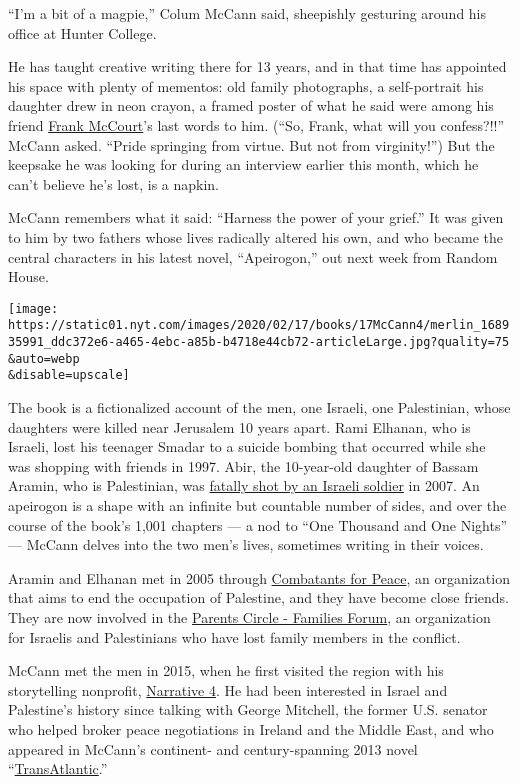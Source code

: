 ``I'm a bit of a magpie,'' Colum McCann said, sheepishly gesturing
around his office at Hunter College.

He has taught creative writing there for 13 years, and in that time has
appointed his space with plenty of mementos: old family photographs, a
self-portrait his daughter drew in neon crayon, a framed poster of what
he said were among his friend
\href{https://www.nytimes.com/2009/07/20/books/20mccourt.html}{Frank
McCourt}'s last words to him. (``So, Frank, what will you confess?!!''
McCann asked. ``Pride springing from virtue. But not from virginity!'')
But the keepsake he was looking for during an interview earlier this
month, which he can't believe he's lost, is a napkin.

McCann remembers what it said: ``Harness the power of your grief.'' It
was given to him by two fathers whose lives radically altered his own,
and who became the central characters in his latest novel,
``Apeirogon,'' out next week from Random House.

\texttt{[image: https://static01.nyt.com/images/2020/02/17/books/17McCann4/merlin\_168935991\_ddc372e6-a465-4ebc-a85b-b4718e44cb72-articleLarge.jpg?quality=75\\\&auto=webp\\\&disable=upscale]}

The book is a fictionalized account of the men, one Israeli, one
Palestinian, whose daughters were killed near Jerusalem 10 years apart.
Rami Elhanan, who is Israeli, lost his teenager Smadar to a suicide
bombing that occurred while she was shopping with friends in 1997. Abir,
the 10-year-old daughter of Bassam Aramin, who is Palestinian, was
\href{https://www.nytimes.com/2020/01/09/movies/afterward-review.html}{fatally
shot by an Israeli soldier} in 2007. An apeirogon is a shape with an
infinite but countable number of sides, and over the course of the
book's 1,001 chapters --- a nod to ``One Thousand and One Nights'' ---
McCann delves into the two men's lives, sometimes writing in their
voices.

Aramin and Elhanan met in 2005 through
\href{https://cfpeace.org/}{Combatants for Peace}, an organization that
aims to end the occupation of Palestine, and they have become close
friends. They are now involved in the
\href{https://www.theparentscircle.org/en/pcff-home-page-en/}{Parents
Circle - Families Forum}, an organization for Israelis and Palestinians
who have lost family members in the conflict.

McCann met the men in 2015, when he first visited the region with his
storytelling nonprofit, \href{https://narrative4.com/}{Narrative 4}. He
had been interested in Israel and Palestine's history since talking with
George Mitchell, the former U.S. senator who helped broker peace
negotiations in Ireland and the Middle East, and who appeared in
McCann's continent- and century-spanning 2013 novel
``\href{https://www.nytimes.com/2013/06/23/books/review/transatlantic-by-colum-mccann.html}{TransAtlantic}.''

